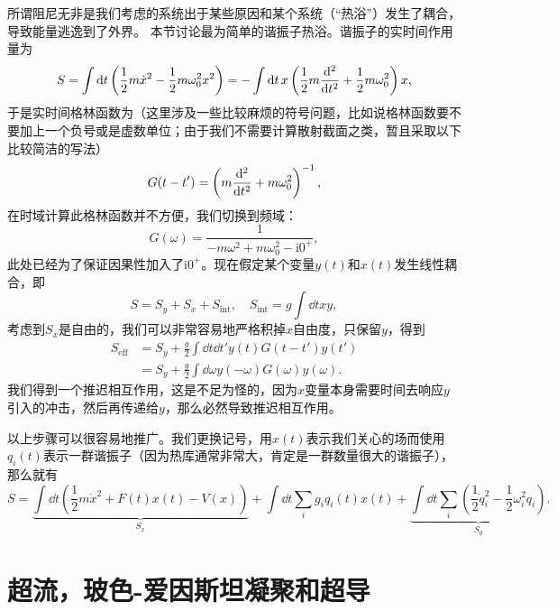 \documentclass[hyperref, UTF8, a4paper]{ctexart}
\newcommand*{\ii}{\mathrm{i}}
\begin{document}
所谓阻尼无非是我们考虑的系统出于某些原因和某个系统（“热浴”）发生了耦合，导致能量逃逸到了外界。
本节讨论最为简单的谐振子热浴。谐振子的实时间作用量为
\begin{equation}
    S = \int \dd{t} \left( \frac{1}{2} m \dot{x}^2 - \frac{1}{2} m \omega_0^2 x^2 \right) = - \int \dd{t} x \left( \frac{1}{2} m \dv[2]{t} + \frac{1}{2} m \omega_0^2 \right) x,
\end{equation}
于是实时间格林函数为（这里涉及一些比较麻烦的符号问题，比如说格林函数要不要加上一个负号或是虚数单位；由于我们不需要计算散射截面之类，暂且采取以下比较简洁的写法）
\begin{equation}
    G(t-t') = \left( m \dv[2]{t} + m \omega_0^2 \right)^{-1},
\end{equation}
在时域计算此格林函数并不方便，我们切换到频域：
\begin{equation}
    G(\omega) = \frac{1}{- m \omega^2 + m \omega_0^2 - \ii 0^+},
\end{equation}
此处已经为了保证因果性加入了$\ii 0^+$。现在假定某个变量$y(t)$和$x(t)$发生线性耦合，即
\begin{equation}
    S = S_y + S_x + S_\text{int}, \quad S_\text{int} = g \int \dd{t} xy,
\end{equation}
考虑到$S_x$是自由的，我们可以非常容易地严格积掉$x$自由度，只保留$y$，得到
\begin{equation}
    \begin{aligned}
        S_\text{eff} &= S_y + \frac{g}{2} \int \dd{t} \dd{t'} y(t) G(t-t') y(t') \\
        &= S_y + \frac{g}{2} \int \dd{\omega} y(-\omega) G(\omega) y(\omega).
    \end{aligned}
\end{equation}
我们得到一个推迟相互作用，这是不足为怪的，因为$x$变量本身需要时间去响应$y$引入的冲击，然后再传递给$y$，那么必然导致推迟相互作用。

以上步骤可以很容易地推广。我们更换记号，用$x(t)$表示我们关心的场而使用$q_i(t)$表示一群谐振子（因为热库通常非常大，肯定是一群数量很大的谐振子），那么就有
\begin{equation}
    S = \underbrace{\int \dd{t} \left( \frac{1}{2} m \dot{x}^2 + F(t) x(t) - V(x) \right)}_{S_x} + \int \dd{t} \sum_i g_i q_i(t) x(t) + \underbrace{\int \dd{t} \sum_i \left( \frac{1}{2} \dot{q}_i^2 - \frac{1}{2} \omega_i^2 q_i \right)}_{S_q}.
\end{equation}


\section{超流，玻色-爱因斯坦凝聚和超导}
\end{document}
